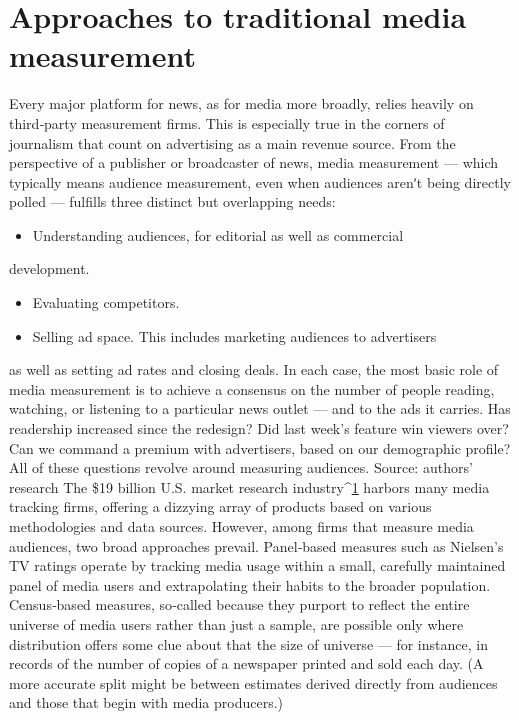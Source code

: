 \section{Approaches to traditional media measurement}
Every major platform for news, as for media more broadly, relies heavily
on third‐party measurement firms. This is especially true in the corners of
journalism that count on advertising as a main revenue source. From the
perspective of a publisher or broadcaster of news, media measurement —
which typically means audience measurement, even when audiences
arenʹt being directly polled — fulfills three distinct but overlapping needs:
\begin{itemize}
\item Understanding audiences, for editorial as well as commercial
\end{itemize}
development.
\begin{itemize}
\item Evaluating competitors.
\item Selling ad space. This includes marketing audiences to advertisers
\end{itemize}
as well as setting ad rates and closing deals.
In each case, the most basic role of media measurement is to achieve a
consensus on the number of people reading, watching, or listening to a
particular news outlet — and to the ads it carries. Has readership
increased since the redesign? Did last week’s feature win viewers over?
Can we command a premium with advertisers, based on our demographic
profile? All of these questions revolve around measuring audiences.
Source: authors’ research
The \$19 billion U.S. market research industry^{\href{#endnotes}{1}} harbors many media
tracking firms, offering a dizzying array of products based on various
methodologies and data sources. However, among firms that measure
media audiences, two broad approaches prevail. Panel‐based measures
such as Nielsen’s TV ratings operate by tracking media usage within a
small, carefully maintained panel of media users and extrapolating their
habits to the broader population. Census‐based measures, so‐called
because they purport to reflect the entire universe of media users rather
than just a sample, are possible only where distribution offers some clue
about that the size of universe — for instance, in records of the number of
copies of a newspaper printed and sold each day. (A more accurate split
might be between estimates derived directly from audiences and those
that begin with media producers.)

